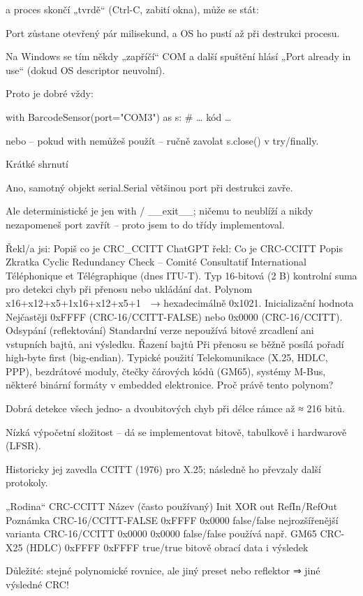 a proces skončí „tvrdě“ (Ctrl-C, zabití okna), může se stát:

    Port zůstane otevřený pár milisekund, a OS ho pustí až při destrukci procesu.

    Na Windows se tím někdy „zapříčí“ COM a další spuštění hlásí „Port already in use“ (dokud OS descriptor neuvolní).

Proto je dobré vždy:

with BarcodeSensor(port="COM3") as s:
    # … kód …

nebo – pokud with nemůžeš použít – ručně zavolat s.close() v try/finally.

Krátké shrnutí

    Ano, samotný objekt serial.Serial většinou port při destrukci zavře.

    Ale deterministické je jen with / __exit__; ničemu to neublíží a nikdy nezapomeneš port zavřít – proto jsem to do třídy implementoval.

Řekl/a jsi:
Popiš co je CRC_CCITT
ChatGPT řekl:
Co je CRC-CCITT
	Popis
Zkratka	Cyclic Redundancy Check – Comité Consultatif International Téléphonique et Télégraphique (dnes ITU-T).
Typ	16-bitová (2 B) kontrolní suma pro detekci chyb při přenosu nebo ukládání dat.
Polynom	x16+x12+x5+1x16+x12+x5+1 → hexadecimálně 0x1021.
Inicializační hodnota	Nejčastěji 0xFFFF (CRC-16/CCITT-FALSE) nebo 0x0000 (CRC-16/CCITT).
Odsypání (reflektování)	Standardní verze nepoužívá bitové zrcadlení ani vstupních bajtů, ani výsledku.
Řazení bajtů	Při přenosu se běžně posílá pořadí high-byte first (big-endian).
Typické použití	Telekomunikace (X.25, HDLC, PPP), bezdrátové moduly, čtečky čárových kódů (GM65), systémy M-Bus, některé binární formáty v embedded elektronice.
Proč právě tento polynom?

    Dobrá detekce všech jedno- a dvoubitových chyb při délce rámce až ≈ 216 bitů.

    Nízká výpočetní složitost – dá se implementovat bitově, tabulkově i hardwarově (LFSR).

    Historicky jej zavedla CCITT (1976) pro X.25; následně ho převzaly další protokoly.

„Rodina“ CRC-CCITT
Název (často používaný)	Init	XOR out	RefIn/RefOut	Poznámka
CRC-16/CCITT-FALSE	0xFFFF	0x0000	false/false	nejrozšířenější varianta
CRC-16/CCITT	0x0000	0x0000	false/false	používá např. GM65
CRC-X25 (HDLC)	0xFFFF	0xFFFF	true/true	bitově obrací data i výsledek

    Důležité: stejné polynomické rovnice, ale jiný preset nebo reflektor ⇒ jiné výsledné CRC!

